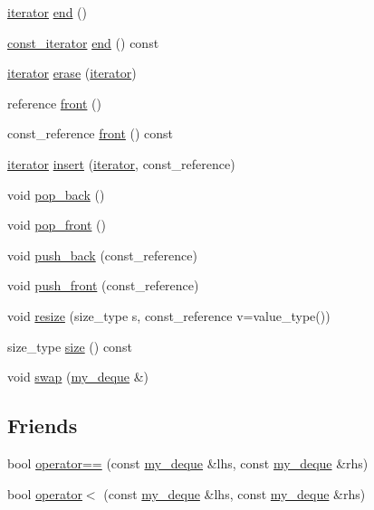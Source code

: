 \begin{DoxyCompactItemize}
\hyperlink{classmy__deque_1_1iterator}{iterator} \hyperlink{classmy__deque_a2576ee71790ebe55ac4200c506540bb5}{end} ()
\item 
\hyperlink{classmy__deque_1_1const__iterator}{const\-\_\-iterator} \hyperlink{classmy__deque_af465c3f8483634e4e656d90f8d0d88fb}{end} () const 
\item 
\hyperlink{classmy__deque_1_1iterator}{iterator} \hyperlink{classmy__deque_a3ffe7f8d8cca7d7509bf3612e0b538d3}{erase} (\hyperlink{classmy__deque_1_1iterator}{iterator})
\item 
reference \hyperlink{classmy__deque_a0eae28af0ffdd813d1f94f57d393fdf8}{front} ()
\item 
const\-\_\-reference \hyperlink{classmy__deque_a0f1239043b7339b8237a0c8bc663be6b}{front} () const 
\item 
\hyperlink{classmy__deque_1_1iterator}{iterator} \hyperlink{classmy__deque_af851d4f7dcd9096f815f1a031c6abdb8}{insert} (\hyperlink{classmy__deque_1_1iterator}{iterator}, const\-\_\-reference)
\item 
void \hyperlink{classmy__deque_a63cc9691ee90701693e948246311c498}{pop\-\_\-back} ()
\item 
void \hyperlink{classmy__deque_a85c322cdc4f629e44abdcf369fdd3dab}{pop\-\_\-front} ()
\item 
void \hyperlink{classmy__deque_a80b0730ab069db3f0504ad744b4979da}{push\-\_\-back} (const\-\_\-reference)
\item 
void \hyperlink{classmy__deque_afb4ce7b818d5094f6aad43f48c4b1283}{push\-\_\-front} (const\-\_\-reference)
\item 
void \hyperlink{classmy__deque_a80369f549dcd0a2ea9bc086fc97c8e25}{resize} (size\-\_\-type s, const\-\_\-reference v=value\-\_\-type())
\item 
size\-\_\-type \hyperlink{classmy__deque_a3100498f22d2dfa480b141f8ef7990ca}{size} () const 
\item 
void \hyperlink{classmy__deque_aa776ffe9e90fb518db3c33c3ddca558d}{swap} (\hyperlink{classmy__deque}{my\-\_\-deque} \&)
\end{DoxyCompactItemize}
\subsection*{Friends}
\begin{DoxyCompactItemize}
\item 
bool \hyperlink{classmy__deque_aca1e37552707f9d7710a6af82cf1262e}{operator==} (const \hyperlink{classmy__deque}{my\-\_\-deque} \&lhs, const \hyperlink{classmy__deque}{my\-\_\-deque} \&rhs)
\item 
bool \hyperlink{classmy__deque_abd32df1d76a0ab0c1519f65cc4fa1363}{operator$<$} (const \hyperlink{classmy__deque}{my\-\_\-deque} \&lhs, const \hyperlink{classmy__deque}{my\-\_\-deque} \&rhs)
\end{DoxyCompactItemize}


